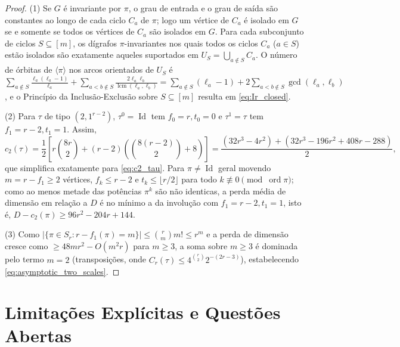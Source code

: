 \documentclass[11pt,a4paper]{article}
\theoremstyle{definition}
\theoremstyle{remark}
\newcommand{\Id}{\operatorname{Id}}
\begin{document}
\begin{proof}
(1) Se $G$ é invariante por $\pi$, o grau de entrada e o grau de saída são constantes ao longo de cada ciclo $C_a$ de $\pi$; logo um vértice de $C_a$ é isolado em $G$ se e somente se todos os vértices de $C_a$ são isolados em $G$. Para cada subconjunto de ciclos $S \subseteq [m]$, os dígrafos $\pi$-invariantes nos quais todos os ciclos $C_a$ ($a \in S$) estão isolados são exatamente aqueles suportados em $U_S = \bigcup_{a \notin S} C_a$. O número de órbitas de $\langle\pi\rangle$ nos arcos orientados de $U_S$ é $\sum_{a\notin S} \frac{\ell_a(\ell_a-1)}{\ell_a} + \sum_{a < b \notin S} \frac{2\ell_a\ell_b}{\operatorname{lcm}(\ell_a,\ell_b)} = \sum_{a\notin S}(\ell_a-1) + 2\sum_{a<b\notin S}\gcd(\ell_a,\ell_b)$, e o Princípio da Inclusão-Exclusão sobre $S \subseteq [m]$ resulta em \eqref{eq:Ir_closed}.

(2) Para $\tau$ de tipo $(2, 1^{r-2})$, $\tau^0 = \Id$ tem $f_0 = r, t_0 = 0$ e $\tau^1 = \tau$ tem $f_1 = r-2, t_1 = 1$. Assim,
\[
  c_2(\tau) = \frac{1}{2}\left[r\binom{8r}{2} + (r-2)\left(\binom{8(r-2)}{2} + 8\right)\right] = \frac{(32r^3 - 4r^2) + (32r^3 - 196r^2 + 408r - 288)}{2},
\]
que simplifica exatamente para \eqref{eq:c2_tau}. Para $\pi \neq \Id$ geral movendo $m = r - f_1 \ge 2$ vértices, $f_k \le r-2$ e $t_k \le \lfloor r/2\rfloor$ para todo $k \not\equiv 0 \pmod{\operatorname{ord}\pi}$; como ao menos metade das potências $\pi^k$ são não identicas, a perda média de dimensão em relação a $D$ é no mínimo a da involução com $f_1 = r-2, t_1 = 1$, isto é, $D - c_2(\pi) \ge 96r^2 - 204r + 144$.

(3) Como $|\{ \pi \in S_r : r - f_1(\pi) = m \}| \le \binom{r}{m} m! \le r^m$ e a perda de dimensão cresce como $\ge 48 m r^2 - O(m^2 r)$ para $m \ge 3$, a soma sobre $m \ge 3$ é dominada pelo termo $m=2$ (transposições, onde $C_r(\tau) \le 4^{\binom{r}{2}} 2^{-(2r-3)}$), estabelecendo \eqref{eq:asymptotic_two_scales}.
\end{proof}

\vspace{8pt}
\section{Limitações Explícitas e Questões Abertas}
\end{document}
